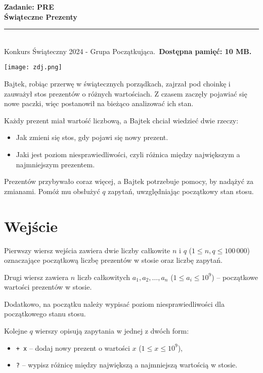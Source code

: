 \documentclass[a4paper,11pt]{article}
\newcommand{\tasktitle}{Świąteczne Prezenty}
\newcommand{\taskshort}{PRE}
\newcommand{\contestinfo}{Konkurs Świąteczny 2024 - Grupa Początkująca.}
\newcommand{\memorylimit}{10 MB}
\begin{document}
\noindent\textbf{\LARGE Zadanie: \taskshort} \\
\textbf{\Large \tasktitle} \\
\rule{\textwidth}{0.4pt} \\
\small \contestinfo \
\textbf{Dostępna pamięć: \memorylimit.}

\begin{center}
\texttt{[image: zdj.png]} %
\end{center}

\noindent Bajtek, robiąc przerwę w świątecznych porządkach, zajrzał pod choinkę i zauważył stos prezentów o różnych wartościach. Z czasem zaczęły pojawiać się nowe paczki, więc postanowił na bieżąco analizować ich stan.

Każdy prezent miał wartość liczbową, a Bajtek chciał wiedzieć dwie rzeczy:
\begin{itemize}
    \item Jak zmieni się stos, gdy pojawi się nowy prezent.
    \item Jaki jest poziom niesprawiedliwości, czyli różnica między największym a najmniejszym prezentem.
\end{itemize}
Prezentów przybywało coraz więcej, a Bajtek potrzebuje pomocy, by nadążyć za zmianami. Pomóż mu obsłużyć $q$ zapytań, uwzględniając początkowy stan stosu.

\section*{Wejście}
Pierwszy wiersz wejścia zawiera dwie liczby całkowite $n$ i $q$ ($1 \leq n, q \leq 100\,000$) oznaczające początkową liczbę prezentów w stosie oraz liczbę zapytań.

Drugi wiersz zawiera $n$ liczb całkowitych $a_1, a_2, \dots, a_n$ ($1 \leq a_i \leq 10^9$) – początkowe wartości prezentów w stosie.

Dodatkowo, na początku należy wypisać poziom niesprawiedliwości dla początkowego stanu stosu.

Kolejne $q$ wierszy opisują zapytania w jednej z dwóch form:
\begin{itemize}
    \item \texttt{+ x} – dodaj nowy prezent o wartości $x$ ($1 \leq x \leq 10^9$),
    \item \texttt{?} – wypisz różnicę między największą a najmniejszą wartością w stosie.
\end{itemize}
\end{document}
